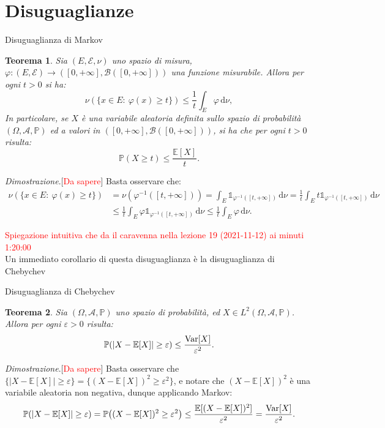 \documentclass[11pt]{book}
\makeatletter
\theoremstyle{Definizione}
\theoremstyle{TeoremaProposizioneLemmaCorollario}
\newtheorem{myteo}{Teorema}[section]
\theoremstyle{OsservazioneNota}
\renewenvironment{proof}[1][\proofname]{\par
  \normalfont \topsep6\p@\@plus6\p@\relax
  \trivlist
  \item[\hskip\labelsep
        \itshape
    #1\@addpunct{.}]\ignorespaces
}{%
  \endtrivlist\@endpefalse
}
\renewcommand{\P}{\mathbb{P}}
\renewcommand{\d}{\mathrm{d}}
\newcommand{\E}{\mathbb{E}}
\newcommand{\Var}{\textup{Var}}
\newcommand{\uno}[1]{\mathds{1}_{#1}}
\renewenvironment{proof}{\textsl{Dimostrazione}.}{}
\makeatother
\begin{document}
\section{Disuguaglianze}
\begin{boxteo}{Disuguaglianza di Markov}
\begin{myteo}\label{teo:DisuguaglianzaDiMarkov}
Sia $(E,\mathcal{E},\nu)$ uno spazio di misura, $\varphi: (E,\mathcal{E}) \longrightarrow ([0,+\infty],\mathcal{B}([0,+\infty]))$ una funzione misurabile. Allora per ogni $t > 0$ si ha:
$$
\nu(\{x\in E:\ \varphi(x) \geq t\}) \leq \frac{1}{t}\int_E \varphi \,\d\nu,
$$
In particolare, se $X$ è una variabile aleatoria definita sullo spazio di probabilità $(\Omega,\mathcal{A},\P)$ ed a valori in $([0,+\infty],\mathcal{B}([0,+\infty]))$, si ha che per ogni $t > 0$ risulta:
$$
\P(X \geq t) \leq \frac{\E[X]}{t}.
$$
\end{myteo}
\tcblower
\begin{proof}[\textcolor{red}{Da sapere}]
Basta osservare che:
\begin{align*}
\nu(\{x\in E:\ \varphi(x) \geq t\}) &= \nu(\varphi^{-1}([t,+\infty])) = \int_E \uno{\varphi^{-1}([t,+\infty])}\,\d\nu  = \frac{1}{t}\int_E t \uno{\varphi^{-1}([t,+\infty])}\,\d\nu\\
&\leq \frac{1}{t}\int_E \varphi \uno{\varphi^{-1}([t,+\infty])}\,\d\nu \leq \frac{1}{t}\int_E \varphi \,\d\nu.
\end{align*}
\end{proof}
\end{boxteo}
\noindent
\textcolor{red}{Spiegazione intuitiva che da il caravenna nella lezione 19 (2021-11-12) ai minuti 1:20:00}\\
Un immediato corollario di questa disuguaglianza è la disuguaglianza di Chebychev
\begin{boxteo}{Disuguaglianza di Chebychev}
\begin{myteo}\label{teo:DisuguaglianzaDiChebychev}
Sia $(\Omega,\mathcal{A},\P)$ uno spazio di probabilità, ed $X\in L^2(\Omega,\mathcal{A},\P)$. Allora per ogni $\varepsilon > 0$ risulta:
$$
\P(|X-\E[X]| \geq \varepsilon) \leq \frac{\Var[X]}{\varepsilon^2}.
$$
\end{myteo}
\tcblower
\begin{proof}[\textcolor{red}{Da sapere}]
Basta osservare che $\{|X-\E[X]|\geq \varepsilon\} = \{(X-\E[X])^2\geq \varepsilon^2\}$, e notare che $(X-\E[X])^2$ è una variabile aleatoria non negativa, dunque applicando Markov:
$$
\P(|X-\E[X]| \geq \varepsilon) = \P\big((X-\E[X])^2\geq \varepsilon^2\big) \leq \frac{\E[(X-\E[X])^2]}{\varepsilon^2} = \frac{\Var[X]}{\varepsilon^2}.
$$
\end{proof}
\end{boxteo}
\end{document}
